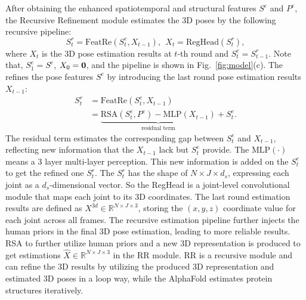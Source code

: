 \documentclass{article}
\begin{document}
After obtaining the enhanced spatiotemporal and structural features $S^e$ and $P^e$, the Recursive Refinement module estimates the 3D poses by the following recursive pipeline:
\begin{equation}
    S_t^r = \text{FeatRe}(S_t^e, X_{t-1}),\ \ X_t = \text{RegHead}(S_t^r), 
\end{equation}
where $X_t$ is the 3D pose estimation results at $t$-th round and $S_t^e=S_{t-1}^r$. Note that, $S^e_1=S^e$, $X_0=\bf{0}$, and the pipeline is shown in Fig.~\ref{fig:model}(c). The  refines the pose features $S^e$ by introducing the last round pose estimation results $X_{t-1}$:
\begin{equation}
\begin{aligned}
    S_t^r &= \text{FeatRe}(S_t^e, X_{t-1})\\
          &= \underbrace{\text{RSA}(S_t^e, P^e) - \text{MLP}(X_{t-1})}_{\text{residual term}} + S_{t}^e.
\end{aligned}
\end{equation}
The residual term estimates the corresponding gap between $S_t^e$ and $X_{t-1}$, reflecting new information that the $X_{t-1}$ lack but $S_t^e$ provide. The $\text{MLP}(\cdot)$ means a 3 layer multi-layer perception.  This new information is added on the $S_{t}^e$ to get the refined one $S_t^r$. The $S_t^r$ has the shape of $N\times J \times d_s$, expressing each joint as a $d_s$-dimensional vector. So the RegHead is a joint-level convolutional module that maps each joint to its 3D coordinates. The last round estimation results are defined as $X^{3d}\in\mathbb R^{N\times J\times 3}$, storing the $(x,y,z)$ coordinate value for each joint across all frames. The recursive estimation pipeline further injects the human priors in the final 3D pose estimation, leading to more reliable results. 
\iffalse
RSA to further utilize human priors and a new 3D representation is produced to get estimations $\hat X\in\mathbb R^{N\times J\times 3}$ in the RR module. RR is a recursive module and can refine the 3D results by utilizing the produced 3D representation and estimated 3D poses in a loop way, while the AlphaFold estimates protein structures iteratively.
\end{document}
